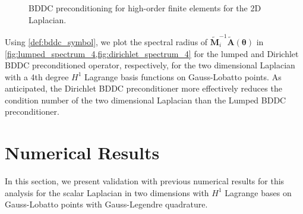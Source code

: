 \documentclass[review]{siamart190516}
\begin{document}
\begin{figure}[!tbp]
  \centering
  \hfill
  \caption{BDDC preconditioning for high-order finite elements for the 2D Laplacian.}
\end{figure}

Using \cref{def:bddc_symbol}, we plot the spectral radius of $\tilde{\mathbf{M}}^{-1}_i \tilde{\mathbf{A}} \left( \boldsymbol{\theta} \right)$ in \cref{fig:lumped_spectrum_4,fig:dirichlet_spectrum_4} for the lumped and Dirichlet BDDC preconditioned operator, respectively, for the two dimensional Laplacian with a 4th degree $H^1$ Lagrange basis functions on Gauss-Lobatto points.
As anticipated, the Dirichlet BDDC preconditioner more effectively reduces the condition number of the two dimensional Laplacian than the Lumped BDDC preconditioner.

\section{Numerical Results}\label{sec:results}

In this section, we present validation with previous numerical results for this analysis for the scalar Laplacian in two dimensions with $H^1$ Lagrange bases on Gauss-Lobatto points with Gauss-Legendre quadrature.
\end{document}
